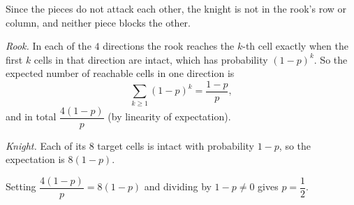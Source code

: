 Since the pieces do not attack each other, the knight is not in the rook's row or column, and neither piece blocks the other.

\emph{Rook.} In each of the $4$ directions the rook reaches the $k$-th cell exactly when the first $k$ cells in that direction are intact, which has probability $(1-p)^k$. So the expected number of reachable cells in one direction is
\[\sum_{k\ge1}(1-p)^k=\dfrac{1-p}{p},\]
and in total $\dfrac{4(1-p)}{p}$ (by linearity of expectation).

\emph{Knight.} Each of its $8$ target cells is intact with probability $1-p$, so the expectation is $8(1-p)$.

Setting $\dfrac{4(1-p)}{p}=8(1-p)$ and dividing by $1-p\ne0$ gives $p=\boxed{\dfrac12}$.
